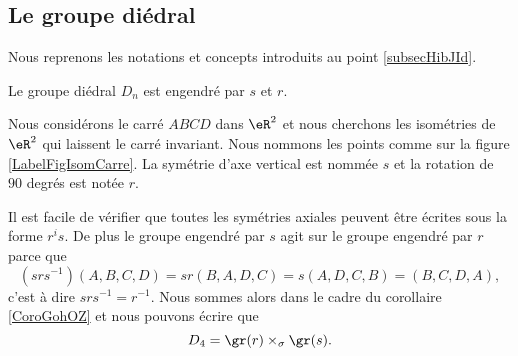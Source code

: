 \subsection{Le groupe diédral}

Nous reprenons les notations et concepts introduits au point \ref{subsecHibJId}.

\begin{proposition} \label{PropLDIPoZ}
    Le groupe diédral \( D_n\) est engendré par \( s\) et \( r\).
\end{proposition}


Nous considérons le carré \( ABCD\) dans \( \eR^2\) et nous cherchons les isométries de \( \eR^2\) qui laissent le carré invariant. Nous nommons les points comme sur la figure \ref{LabelFigIsomCarre}. La symétrie d'axe vertical est nommée \( s\) et la rotation de \( 90\) degrés est notée \( r\).
\newcommand{\CaptionFigIsomCarre}{Le carré dont nous étudions le groupe diédral.}


Il est facile de vérifier que toutes les symétries axiales peuvent être écrites sous la forme \( r^is\). De plus le groupe engendré par \( s\) agit sur le groupe engendré par \( r\) parce que
\begin{equation}
    (srs^{-1})(A,B,C,D)=sr(B,A,D,C)=s(A,D,C,B)=(B,C,D,A),
\end{equation}
c'est à dire \( srs^{-1}=r^{-1}\). Nous sommes alors dans le cadre du corollaire \ref{CoroGohOZ} et nous pouvons écrire que
\begin{equation}
    D_4=\gr(r)\times_{\sigma}\gr(s).
\end{equation}
